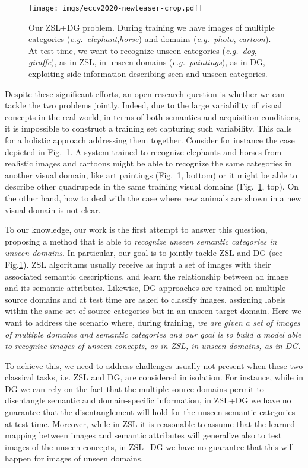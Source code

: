 \documentclass[runningheads]{llncs}
\newcommand{\eg}{\emph{e.g.~}}
\begin{document}
\begin{figure}[tb]
  \centering
  \texttt{[image: imgs/eccv2020-newteaser-crop.pdf]}
   \caption{Our ZSL+DG problem. During training we have images of multiple categories (\eg \textit{elephant},\textit{horse}) and domains (\eg \textit{photo}, \textit{cartoon}). At test time, we want to recognize unseen categories (\eg \textit{dog}, \textit{giraffe}), as in ZSL, in unseen domains (\eg \textit{paintings}), as in DG, exploiting side information describing seen and unseen categories. }
  \label{fig:teaser}
 \end{figure}

Despite these significant efforts, an open research question is whether we can tackle the two problems jointly. {Indeed, due to the large variability of visual concepts in the real world, in terms of both semantics and acquisition conditions, it is impossible to construct a training set capturing such variability. This calls for a holistic approach addressing them together.} Consider for instance the case depicted in Fig.~\ref{fig:teaser}. A system trained to recognize elephants and horses from realistic images and cartoons might be able to recognize the same categories in another visual domain, like art paintings (Fig.~\ref{fig:teaser}, bottom) or it might be able to describe other quadrupeds in the same training visual domains (Fig.~\ref{fig:teaser}, top). On the other hand, how to deal with the case where new animals are shown in a new visual domain is not clear.

To our knowledge, our work is the first attempt to answer this question, proposing a method that is able to \textit{recognize unseen semantic categories in unseen domains}. In particular, our goal is to jointly tackle ZSL and DG (see Fig.\ref{fig:teaser}). ZSL algorithms usually receive as input a set of images with their associated semantic descriptions, and learn the relationship between an image and its semantic attributes. Likewise, DG approaches are trained on multiple source domains and at test time are asked to classify images, assigning labels within the same set of source categories but in an unseen target domain. 
Here we want to address the scenario where, during training, 
\emph{we are given a set of images of multiple domains and semantic categories and our goal is to build a model able to recognize images of unseen concepts, as in ZSL, in unseen domains, as in DG.}


To achieve this, we need to address challenges usually not present  
when these two classical tasks, i.e. ZSL and DG, are considered in isolation. For instance, while in DG we can rely on the fact that the multiple source domains permit to disentangle semantic and domain-specific information, in ZSL+DG we have no guarantee that the disentanglement will hold for the unseen semantic categories at test time. Moreover, while in ZSL it is reasonable to assume that the learned mapping between images and semantic attributes will generalize also to test images of the unseen concepts, 
in ZSL+DG we have no guarantee that this will happen for images of unseen domains. 
\end{document}
